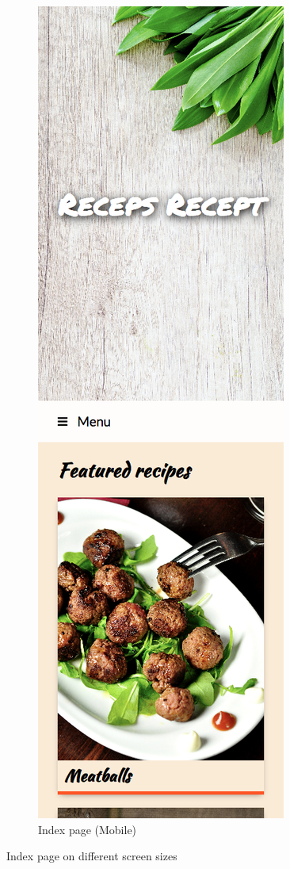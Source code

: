 \documentclass[a4paper]{scrartcl}
\begin{document}
\begin{figure}
\begin{subfigure}[b]{0.2\linewidth}
		\includegraphics[width=\linewidth]{images/screenshot-index-mobile.png}
		\caption{Index page (Mobile)}
		\label{fig:index-page-mobile}
	\end{subfigure}
	\caption{Index page on different screen sizes}
\end{figure}
\end{document}
